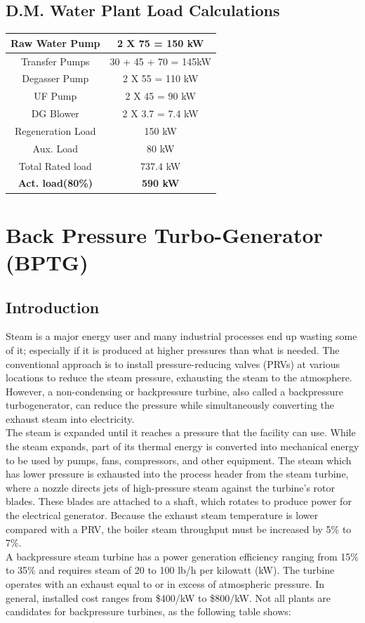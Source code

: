 \documentclass[english,11pt]{report}
\begin{document}
\section{D.M. Water Plant Load Calculations}
\begin{center}
\begin{tabular}{|c|c|}
    \hline
    Raw Water Pump & 2 X 75 = 150 kW \\ \hline
    Transfer Pumps & 30 + 45 + 70 = 145kW \\ \hline
    Degasser Pump & 2 X 55 = 110 kW \\ \hline
    UF Pump & 2 X 45 = 90 kW \\ \hline
    DG Blower & 2 X 3.7 = 7.4 kW \\ \hline
    Regeneration Load & 150 kW \\ \hline
    Aux. Load & 80 kW \\ \hline
    Total Rated load & 737.4 kW \\ \hline
    \textbf{Act. load(80\%) }& \textbf{590 kW} \\ \hline
\end{tabular}
\end{center}

\chapter{Back Pressure Turbo-Generator (BPTG)}
\section{Introduction}
Steam is a major energy user and many industrial processes end up wasting some of it; especially if it is produced at higher pressures than what is needed. The conventional approach is to install pressure-reducing valves (PRVs) at various locations to reduce the steam pressure, exhausting the steam to the atmosphere. However, a non-condensing or backpressure turbine, also called a backpressure turbogenerator, can reduce the pressure while simultaneously converting the exhaust steam into electricity.\\
The steam is expanded until it reaches a pressure that the facility can use. While the steam expands, part of its thermal energy is converted into mechanical energy to be used by pumps, fans, compressors, and other equipment. The steam which has lower pressure  is exhausted into the process header from the steam turbine, where a nozzle directs jets of high-pressure steam against the turbine's rotor blades. These blades are attached to a shaft, which rotates to produce power for the electrical generator. Because the exhaust steam temperature is lower compared with a PRV, the boiler steam throughput must be increased by 5\% to 7\%.\\
A backpressure steam turbine has a power generation efficiency ranging from 15\% to 35\% and requires steam of 20 to 100 lb/h per kilowatt (kW). The turbine operates with an exhaust equal to or in excess of atmospheric pressure. In general, installed cost ranges from \$400/kW to \$800/kW. Not all plants are candidates for backpressure turbines, as the following table shows:\\
\end{document}
